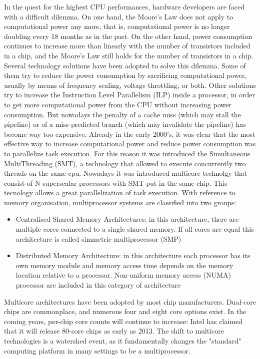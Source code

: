 In the quest for the highest CPU performances, hardware developers are faced with a difficult dilemma. On one hand, the Moore's Law does not apply to 
computational power any more, that is, computational power is no longer doubling every 18 months as in the past. On the other hand, power consumption 
continues to increase more than linearly with the number of transistors included in a chip, and the Moore's Law still holds for the number of transistors 
in a chip.
Several technology solutions have been adopted to solve this dilemma. Some of them try to reduce the power consumption by sacrificing computational power,
usually by means of frequency scaling, voltage throttling, or both. Other solutions try to increase the Instruction Level Parallelism (ILP) inside a 
processor, in order to get more computational power from the CPU without increasing power consumption. But nowadays the penalty of a cache miss 
(which may stall the pipeline) or of a miss-predicted branch (which may invalidate the pipeline) has become way too expensive.
Already in the early 2000's, it was clear that the most effective way to increase computational power and reduce power consumption was to parallelize
task execution. For this reason it was introduced the Simultaneous MultiThreading (SMT), a technology that allowed to execute 
concurrently two threads on the same cpu. Nowadays it was introduced multicore technolgy that consist of N superscalar processors with SMT 
put in the same chip. This tecnology allows a great parallelization of task execution.
With reference to memory organisation, multiprocessor systems are classified into two groups:

\begin{itemize}
	\item Centralised Shared Memory Architectures: in this architecture, there are multiple cores connected to a single shared memory. If all cores are
	      equal this architecture is called simmetric multiprocessor (SMP)
	\item Distributed Memory Architecture: in this architecture each processor has its own memory module and memory access time depends on the memory 
	      location relative to a processor. Non-uniform memory access (NUMA) processor are included in this category of architecture
\end{itemize}

Multicore architectures have been adopted by most chip manufacturers. Dual-core chips are commonplace, and numerous four and eight core options exist. 
In the coming years, per-chip core counts will continue to increase: Intel has claimed that it will release 80-core chips as early as 2013. 
The shift to multicore technologies is a watershed event, as it fundamentally changes the "standard" computing platform in many settings to be a 
multiprocessor.

